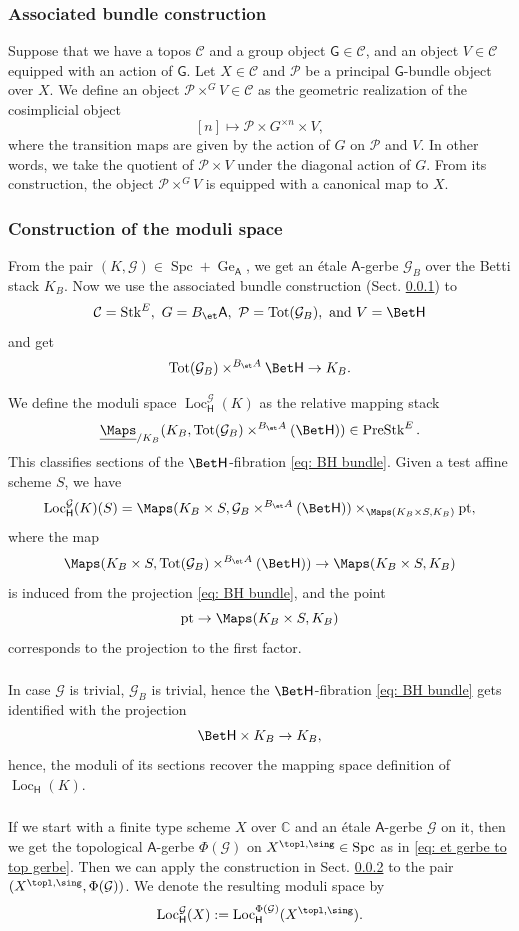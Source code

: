 \documentclass[10pt]{amsart}
\newcommand{\sssec}{\subsubsection}
\theoremstyle{remark}
\newcommand{\mc}[1]{\mathcal{#1}}
\newcommand{\ul}{\underline}
\newcommand{\C}{\mathbb{C}}
\newcommand{\on}{\operatorname}
\newcommand{\cG}{\mathcal{G}}
\newcommand{\Loc}{\on{Loc}}
\newcommand{\PreStk}{\on{PreStk}}
\newcommand{\Stk}{\on{Stk}}
\newcommand{\Spc}{\on{Spc}}
\newcommand{\pt}{\on{pt}}
\newcommand{\sffH}{\mathsf{H}}
\newcommand{\sfA}{\mathsf{A}}
\begin{document}
\sssec{Associated bundle construction}\label{sssec: Associated bundle construction}
Suppose that we have a topos $\mc{C}$ and a group object $\mathsf{G}\in\mc{C}$, and an object $V\in\mc{C}$ equipped with an action of $\mathsf{G}$. Let $X\in\mc{C}$ and $\mc{P}$ be a principal $\mathsf{G}$-bundle object over $X$. We define an object $\mc{P}\times^G V\in \mc{C}$ as the geometric realization of the cosimplicial object
\[[n]\mapsto \mc{P}\times G^{\times n}\times V,\]
where the transition maps are given by the action of $G$ on $\mc{P}$ and $V$. In other words, we take the quotient of $\mc{P}\times V$ under the diagonal action of $G$. 
From its construction, the object $\mc{P}\times^G V$ is equipped with a canonical map to $X$.

\sssec{Construction of the moduli space}\label{sssec: construction of twlocsys}
 From the pair $(K,\cG)\in \Spc+\on{Ge}_{\sfA}$, we get an \'etale $\sfA$-gerbe $\mc{G}_B$ over the Betti stack $K_B$.
Now we use the associated bundle construction (Sect. \ref{sssec: Associated bundle construction}) to
\[\mc{C}=\Stk^E,\ G=B_{\et}\sfA,\ \mc{P}=\on{Tot}(\mc{G}_B),\text{ and } V=\Bet \mathsf{H}\]
and get
\begin{equation}\label{eq: BH bundle}
\on{Tot}(\mc{G}_B)\times^{B_{\et}A} \Bet \mathsf{H}\rightarrow K_B.
\end{equation}

We define the moduli space $\Loc^{\mc{G}}_{\mathsf{H}}(K)$ as the relative mapping stack
\[\ul{\Maps}_{/K_B}(K_B, \on{Tot}(\mc{G}_B)\times^{B_{\et}A} (\Bet \mathsf{H})) \in \PreStk^E.\]
This classifies sections of the $\Bet \mathsf{H}$-fibration \eqref{eq: BH bundle}.
Given a test affine scheme $S$, we have
\[\Loc^{\mc{G}}_{\mathsf{H}}(K)(S)=\Maps(K_B\times S,\mc{G}_B\times^{B_{\et}A} (\Bet \mathsf{H}))\times_{\Maps(K_B\times S,K_B)}\pt,\]
where the map
\[\Maps(K_B\times S,\on{Tot}(\mc{G}_B)\times^{B_{\et}A} (\Bet \mathsf{H}))\rightarrow \Maps(K_B\times S,K_B)\]
is induced from the projection \eqref{eq: BH bundle}, and the point
\[\pt\rightarrow \Maps(K_B\times S,K_B)\]  corresponds to the projection to the first factor.

\sssec{}
In case $\mc{G}$ is trivial, $\mc{G}_B$ is trivial, hence the $\Bet \mathsf{H}$-fibration \eqref{eq: BH bundle} gets identified with the projection
\[\Bet \sffH\times K_B\rightarrow K_B,\]
hence, the moduli of its sections recover the mapping space definition of $\Loc_{\mathsf{H}}(K)$.

\sssec{}
If we start with a finite type scheme $X$ over $\C$ and an \'etale $\sfA$-gerbe $\cG$ on it, then we get the topological $\sfA$-gerbe $\Phi(\cG)$ on $X^{\topl,\sing}\in\Spc$ as in \eqref{eq: et gerbe to top gerbe}. Then we can apply the construction in Sect. \ref{sssec: construction of twlocsys} to the pair $(X^{\topl,\sing},\Phi(\cG))$. We denote the resulting moduli space by 
\[\Loc^{\cG}_{\mathsf{H}}(X):=\Loc^{\Phi(\cG)}_{\mathsf{H}}(X^{\topl,\sing}).\]
\end{document}
